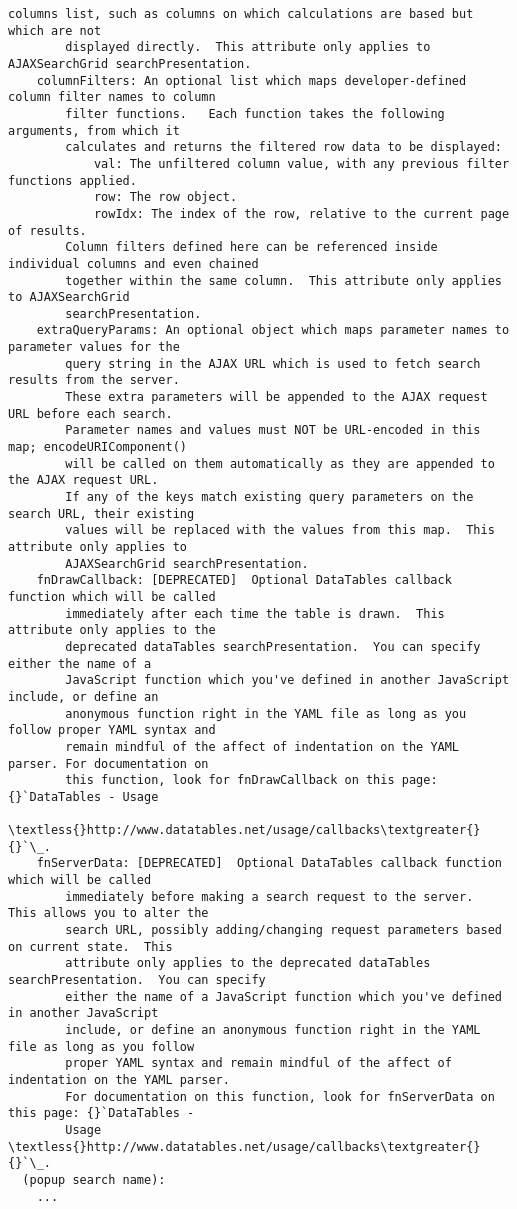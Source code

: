 \documentclass[letterpaper,10pt,english]{sphinxmanual}
\begin{document}
\begin{Verbatim}[commandchars=\\\{\}]
        columns list, such as columns on which calculations are based but which are not
        displayed directly.  This attribute only applies to AJAXSearchGrid searchPresentation.
    columnFilters: An optional list which maps developer-defined column filter names to column
        filter functions.   Each function takes the following arguments, from which it
        calculates and returns the filtered row data to be displayed:
            val: The unfiltered column value, with any previous filter functions applied.
            row: The row object.
            rowIdx: The index of the row, relative to the current page of results.
        Column filters defined here can be referenced inside individual columns and even chained
        together within the same column.  This attribute only applies to AJAXSearchGrid
        searchPresentation.
    extraQueryParams: An optional object which maps parameter names to parameter values for the
        query string in the AJAX URL which is used to fetch search results from the server.
        These extra parameters will be appended to the AJAX request URL before each search.
        Parameter names and values must NOT be URL-encoded in this map; encodeURIComponent()
        will be called on them automatically as they are appended to the AJAX request URL.
        If any of the keys match existing query parameters on the search URL, their existing
        values will be replaced with the values from this map.  This attribute only applies to
        AJAXSearchGrid searchPresentation.
    fnDrawCallback: [DEPRECATED]  Optional DataTables callback function which will be called
        immediately after each time the table is drawn.  This attribute only applies to the
        deprecated dataTables searchPresentation.  You can specify either the name of a
        JavaScript function which you've defined in another JavaScript include, or define an
        anonymous function right in the YAML file as long as you follow proper YAML syntax and
        remain mindful of the affect of indentation on the YAML parser. For documentation on
        this function, look for fnDrawCallback on this page: {}`DataTables - Usage
        \textless{}http://www.datatables.net/usage/callbacks\textgreater{}{}`\_.
    fnServerData: [DEPRECATED]  Optional DataTables callback function which will be called
        immediately before making a search request to the server.  This allows you to alter the
        search URL, possibly adding/changing request parameters based on current state.  This
        attribute only applies to the deprecated dataTables searchPresentation.  You can specify
        either the name of a JavaScript function which you've defined in another JavaScript
        include, or define an anonymous function right in the YAML file as long as you follow
        proper YAML syntax and remain mindful of the affect of indentation on the YAML parser.
        For documentation on this function, look for fnServerData on this page: {}`DataTables -
        Usage \textless{}http://www.datatables.net/usage/callbacks\textgreater{}{}`\_.
  (popup search name):
    ...
\end{Verbatim}
\end{document}
